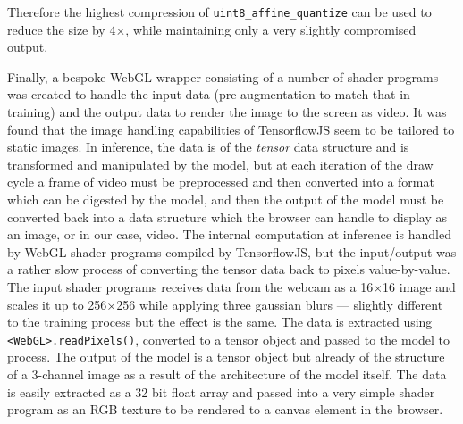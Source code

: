 \documentclass{article}
\begin{document}
Therefore the highest compression of \verb|uint8_affine_quantize| can be used to reduce the size by 4$\times$, while maintaining only a very slightly compromised output.

Finally, a bespoke WebGL wrapper consisting of a number of shader programs was created to handle the input data (pre-augmentation to match that in training) and the output data to render the image to the screen as video. It was found that the image handling capabilities of TensorflowJS seem to be tailored to static images. In inference, the data is of the \textit{tensor} data structure and is transformed and manipulated by the model, but at each iteration of the draw cycle a frame of video must be preprocessed and then converted into a format which can be digested by the model, and then the output of the model must be converted back into a data structure which the browser can handle to display as an image, or in our case, video. The internal computation at inference is handled by WebGL shader programs compiled by TensorflowJS, but the input/output was a rather slow process of converting the tensor data back to pixels value-by-value. The input shader programs receives data from the webcam as a 16$\times$16 image and scales it up to 256$\times$256 while applying three gaussian blurs --- slightly different to the training process but the effect is the same. The data is extracted using \verb|<WebGL>.readPixels()|, converted to a tensor object and passed to the model to process. The output of the model is a tensor object but already of the structure of a 3-channel image as a result of the architecture of the model itself. The data is easily extracted as a 32 bit float array and passed into a very simple shader program as an RGB texture to be rendered to a canvas element in the browser.

\end{document}
